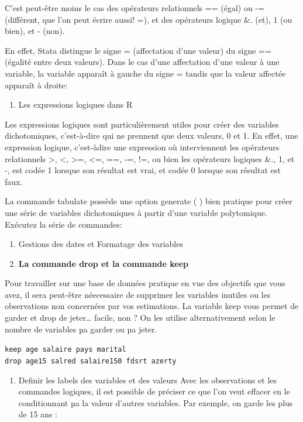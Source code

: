 \documentclass[
]{book}
\providecommand{\tightlist}{%
  \setlength{\itemsep}{0pt}\setlength{\parskip}{0pt}}
\begin{document}
C'est peut-être moins le cas des opérateurs relationnels == (égal)
ou -= (différent, que l'on peut écrire aussi! =), et des opérateurs
logique \&. (et), 1 (ou bien), et - (non).

En effet, Stata distingue le signe = (affectation d'une valeur) du
signe == (égalité entre deux valeurs). Dans le cas d'une
affectation d'une valeur à une variable, la variable apparaît à
gauche du signe = tandis que la valeur affectée apparaît à droite:

\begin{enumerate}
\def\labelenumi{(\arabic{enumi})}
\setcounter{enumi}{2}
\tightlist
\item
  Les expressions logiques dans R
\end{enumerate}

Les expressions logiques sont particulièrement utiles pour créer
des variables dichotomiques, c'est-à-dire qui ne prennent que
deux valeurs, 0 et 1. En effet, une expression logique, c'est-àdire
une expression où interviennent les opérateurs relationnels
\textgreater, \textless, \textgreater=, \textless=, ==, -=, !=, ou bien les opérateurs logiques \&., 1, et
-, est codée 1 lorsque son résultat est vrai, et codée 0 lorsque
son résultat est faux.

La commande tabulate possède une option generate ( ) bien
pratique pour créer une série de variables dichotomiques à partir
d'une variable polytomique. Exécutez la série de commandes:

\begin{enumerate}
\def\labelenumi{(\arabic{enumi})}
\setcounter{enumi}{3}
\item
  Gestions des dates et Formatage des variables
\item
  \textbf{La commande drop et la commande keep}
\end{enumerate}

Pour travailler sur une base de données pratique en vue des objectifs que vous avez, il sera peut-être néecessaire de supprimer les variables inutiles ou les observations non concernées par vos estimations. La variable keep vous permet de garder et drop de jeter\ldots{} facile, non ? On les utilise alternativement selon le nombre de variables µa garder ou µa jeter.

\texttt{keep\ age\ salaire\ pays\ marital}
\texttt{drop\ age15\ salred\ salaire150\ fdsrt\ azerty}

\begin{enumerate}
\def\labelenumi{(\arabic{enumi})}
\setcounter{enumi}{5}
\tightlist
\item
  Definir les labels des variables et des valeurs
  Avec les observations et les commandes logiques, il est possible de préciser ce que l'on veut effacer en le conditionnant µa la valeur d'autres variables. Par exemple, on garde les plus de 15 ans :
\end{enumerate}
\end{document}
